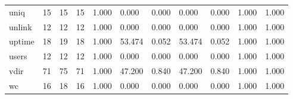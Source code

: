 \begin{longtable}{lp{1.8cm}p{1.8cm}p{1.8cm}p{1.8cm}p{1.8cm}p{1.8cm}p{1.8cm}p{1.8cm}p{1.8cm}p{1.8cm}}
uniq      &                           15 &                 15 &                                15 &                                      1.000 &                                  0.000 &                                        0.000 &                             0.000 &                                   0.000 &                              1.000 &                                              1.000 \\
unlink    &                           12 &                 12 &                                12 &                                      1.000 &                                  0.000 &                                        0.000 &                             0.000 &                                   0.000 &                              1.000 &                                              1.000 \\
uptime    &                           18 &                 19 &                                18 &                                      1.000 &                                 53.474 &                                        0.052 &                            53.474 &                                   0.052 &                              1.000 &                                              1.000 \\
users     &                           12 &                 12 &                                12 &                                      1.000 &                                  0.000 &                                        0.000 &                             0.000 &                                   0.000 &                              1.000 &                                              1.000 \\
vdir      &                           71 &                 75 &                                71 &                                      1.000 &                                 47.200 &                                        0.840 &                            47.200 &                                   0.840 &                              1.000 &                                              1.000 \\
wc        &                           16 &                 18 &                                16 &                                      1.000 &                                  0.000 &                                        0.000 &                             0.000 &                                   0.000 &                              1.000 &                                              1.000 \\

\end{longtable}
